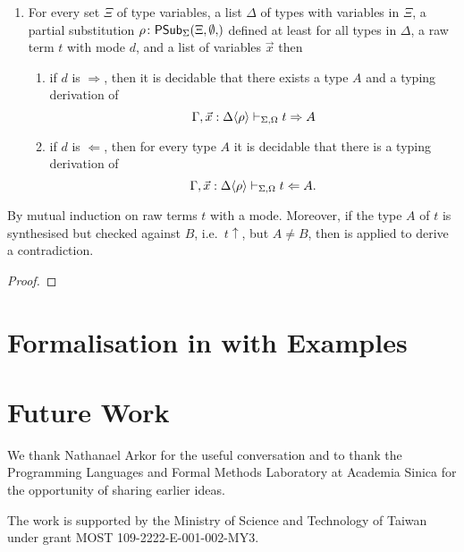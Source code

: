 \documentclass[acmsmall,screen]{acmart}
\theoremstyle{acmdefinition}
\begin{document}
\begin{theorem}
\begin{enumerate}
    \item For every set $\Xi$ of type variables, a list $\Delta$ of types with variables in $\Xi$, a partial substitution $\rho\colon \PSub{\Xi, \emptyset}$ defined at least for all types in $\Delta$, a raw term $t$ with mode $d$, and a list of variables $\vec{x}$ then 
      \begin{enumerate}
        \item if $d$ is $\Rightarrow$, then it is decidable that there exists a type $A$ and a typing derivation of
          \[
            \Gamma, \vec{x} : {\Delta}\!\left<{\rho}\right> \vdash_{\Sigma, \Omega} t \Rightarrow A 
          \]
        \item if $d$ is $\Leftarrow$, then for every type $A$ it is decidable that there is a typing derivation of 
          \[
            \Gamma, \vec{x} : {\Delta}\!\left<{\rho}\right> \vdash_{\Sigma, \Omega} t \Leftarrow A.
          \]
      \end{enumerate}
  \end{enumerate}
\end{theorem}
By mutual induction on raw terms $t$ with a mode. 
Moreover, if the type $A$ of $t$ is synthesised but checked against $B$, i.e.\ $t\uparrow$, but $A \neq B$, then  is applied to derive a contradiction.
\begin{proof}
\end{proof}


\section{Formalisation in \Agda with Examples}


\section{Future Work}
\begin{acks}
We thank Nathanael Arkor for the useful conversation and to thank the Programming Languages and Formal Methods Laboratory at Academia Sinica for the opportunity of sharing earlier ideas.

The work is supported by the Ministry of Science and Technology of Taiwan under grant MOST 109-2222-E-001-002-MY3.
\end{acks}



\end{document}
